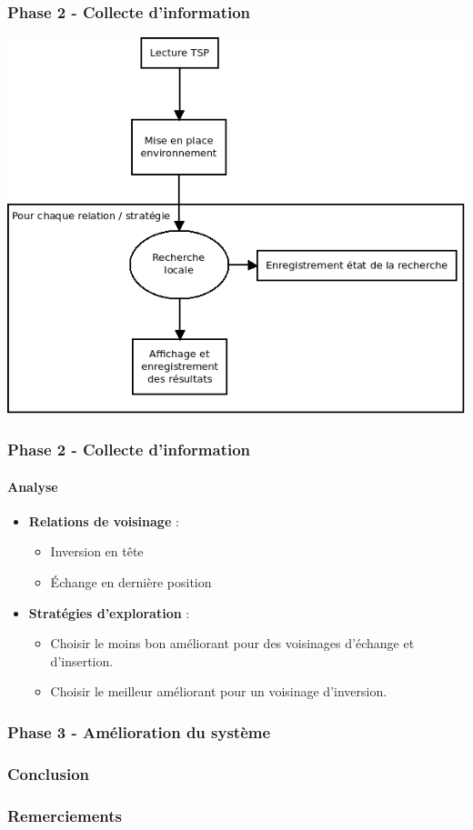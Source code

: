 \documentclass{beamer}
\begin{document}
\begin{frame}
  \frametitle{Phase 2 - Collecte d'information}
  
  \begin{center}
    \includegraphics[width=\textwidth,height=0.8\textheight]{images/exec-phase-2.png}
  \end{center}
  
\end{frame}


\begin{frame}
  \frametitle{Phase 2 - Collecte d'information}
  \framesubtitle{Analyse}
  
  \begin{itemize}
    \item \textbf{Relations de voisinage} :
      \begin{itemize}
	\item Inversion en tête
	\item Échange en dernière position
      \end{itemize}
    \item \textbf{Stratégies d'exploration} :
      \begin{itemize}
	\item Choisir le moins bon améliorant pour des voisinages d'échange et
d'insertion.
	\item Choisir le meilleur améliorant pour un voisinage d'inversion.
      \end{itemize}
  \end{itemize}
  
\end{frame}


\begin{frame}
  \frametitle{Phase 3 - Amélioration du système}
  
  
\end{frame}



\begin{frame}
  \frametitle{Conclusion}
  
  
\end{frame}


\begin{frame}
  \frametitle{Remerciements}
  
  
\end{frame}
\end{document}
